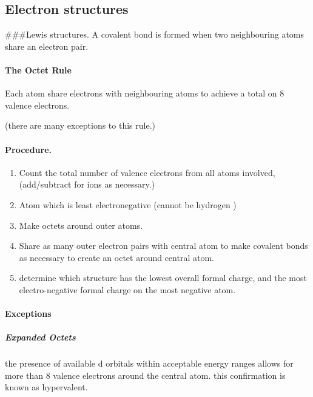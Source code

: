 \documentclass[]{article}
\providecommand{\tightlist}{%
  \setlength{\itemsep}{0pt}\setlength{\parskip}{0pt}}
\let\oldparagraph\paragraph
\renewcommand{\paragraph}[1]{\oldparagraph{#1}\mbox{}}
\let\oldsubparagraph\subparagraph
\renewcommand{\subparagraph}[1]{\oldsubparagraph{#1}\mbox{}}
\begin{document}
\hypertarget{electron-structures}{%
\subsection{Electron structures}\label{electron-structures}}

\#\#\#Lewis structures. A covalent bond is formed when two neighbouring
atoms share an electron pair.

\hypertarget{the-octet-rule}{%
\paragraph{The Octet Rule}\label{the-octet-rule}}

Each atom share electrons with neighbouring atoms to achieve a total on
8 valence electrons.

(there are many exceptions to this rule.)

\hypertarget{procedure.}{%
\paragraph{Procedure.}\label{procedure.}}

\begin{enumerate}
\def\labelenumi{\arabic{enumi}.}
\tightlist
\item
  Count the total number of valence electrons from all atoms involved,
  (add/subtract for ions as necessary.)
\item
  Atom which is least electronegative (cannot be hydrogen )
\item
  Make octets around outer atoms.
\item
  Share as many outer electron pairs with central atom to make covalent
  bonds as necessary to create an octet around central atom.
\item
  determine which structure has the lowest overall formal charge, and
  the most electro-negative formal charge on the most negative atom.
\end{enumerate}

\hypertarget{exceptions-1}{%
\paragraph{Exceptions}\label{exceptions-1}}

\hypertarget{expanded-octets}{%
\subparagraph{Expanded Octets}\label{expanded-octets}}

the presence of available d orbitals within acceptable energy ranges
allows for more than 8 valence electrons around the central atom. this
confirmation is known as hypervalent.
\end{document}
